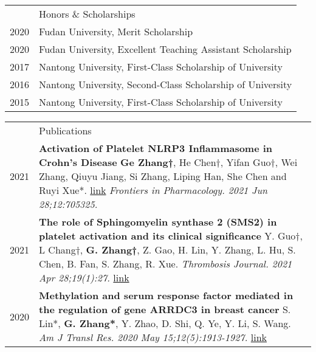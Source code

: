 \documentclass[letterpaper, 11pt]{article}
\newcommand{\headingfont}{\Large\color{LimeGreen}}
\newenvironment{SectionTable}[1]{
	\renewcommand*{\arraystretch}{1.7}
	\setlength{\tabcolsep}{10pt}
	\begin{longtable}{Rp{5.2in}} & #1 \\}
{\end{longtable}\vspace{-.3cm}}
\newenvironment{SectionTableSingleSpace}[1]{
	\renewcommand*{\arraystretch}{1.2}
	\setlength{\tabcolsep}{10pt}
	\begin{longtable}{Rp{5.2in}} & #1 \\[0.6em]}
{\end{longtable}\vspace{-.3cm}}
\begin{document}

\begin{SectionTableSingleSpace}{\headingfont Honors \& Scholarships}
2020 & 
Fudan University, Merit Scholarship \\

2020 &
Fudan University, Excellent Teaching Assistant Scholarship \\

2017 &
Nantong University, First-Class Scholarship of University \\

2016 &
Nantong University, Second-Class Scholarship of University  \\

2015 &
Nantong University, First-Class Scholarship of University 
\end{SectionTableSingleSpace}


\begin{SectionTable}{\headingfont Publications} 
2021 & 
\textbf{Activation of Platelet NLRP3 Inflammasome in Crohn's Disease} \newline
\textbf{Ge Zhang†}, He Chen†, Yifan Guo†, Wei Zhang, Qiuyu Jiang, Si Zhang, Liping Han, She Chen and Ruyi Xue*. \newline
\href{https://pubmed.ncbi.nlm.nih.gov/34262463/}{link} \textit{Frontiers in Pharmacology. 2021 Jun 28;12:705325.} \\

2021 & 
\textbf{The role of Sphingomyelin synthase 2 (SMS2) in platelet activation and its clinical significance} \newline
Y. Guo†, L Chang†, \textbf{G. Zhang†}, Z. Gao, H. Lin, Y. Zhang, L. Hu, S. Chen, B. Fan, S. Zhang, R. Xue. \newline
\textit{Thrombosis Journal. 2021 Apr 28;19(1):27.} \href{https://pubmed.ncbi.nlm.nih.gov/34262463/}{link} \\

2020 & 
\textbf{Methylation and serum response factor mediated in the regulation of gene ARRDC3 in breast cancer} \newline
S. Lin*, \textbf{G. Zhang*}, Y. Zhao, D. Shi, Q. Ye, Y. Li, S. Wang. \newline
\textit{Am J Transl Res. 2020 May 15;12(5):1913-1927.} \href{https://pubmed.ncbi.nlm.nih.gov/32509187/}{link}
\end{SectionTable}

\end{document}
